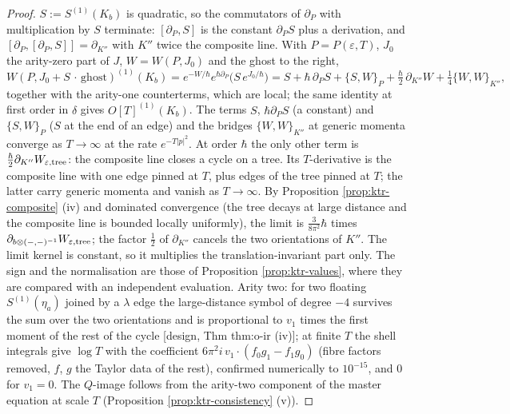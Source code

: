 \begin{proof}
$S:=S^{(1)}(K_b)$ is quadratic, so the commutators of $\partial_P$ with multiplication by $S$ terminate: $[\partial_P,S]$ is the constant $\partial_PS$ plus a derivation, and $[\partial_P,[\partial_P,S]]=\partial_{K''}$ with $K''$ twice the composite line. With $P=P(\varepsilon,T)$, $J_0$ the arity-zero part of $J$, $W=W(P,J_0)$ and the ghost to the right,
\[
W(P,J_0+S\,\cdot\,\text{ghost})^{(1)}(K_b)=e^{-W/\hbar}e^{\hbar\partial_P}\big(S\,e^{J_0/\hbar}\big)=S+\hbar\,\partial_PS+\{S,W\}_P+\tfrac\hbar2\,\partial_{K''}W+\tfrac14\{W,W\}_{K''},
\]
together with the arity-one counterterms, which are local; the same identity at first order in $\delta$ gives $O[T]^{(1)}(K_b)$. The terms $S$, $\hbar\partial_PS$ (a constant) and $\{S,W\}_P$ ($S$ at the end of an edge) and the bridges $\{W,W\}_{K''}$ at generic momenta converge as $T\to\infty$ at the rate $e^{-T|p|^2}$. At order $\hbar$ the only other term is $\tfrac\hbar2\partial_{K''}W_{\varepsilon,\rm tree}$: the composite line closes a cycle on a tree. Its $T$-derivative is the composite line with one edge pinned at $T$, plus edges of the tree pinned at $T$; the latter carry generic momenta and vanish as $T\to\infty$. By Proposition \ref{prop:ktr-composite} (iv) and dominated convergence (the tree decays at large distance and the composite line is bounded locally uniformly), the limit is $\tfrac{3}{8\pi^2}\hbar$ times $\partial_{b\otimes(-,-)^{-1}}W_{\varepsilon,\rm tree}$; the factor $\tfrac12$ of $\partial_{K''}$ cancels the two orientations of $K''$. The limit kernel is constant, so it multiplies the translation-invariant part only. The sign and the normalisation are those of Proposition \ref{prop:ktr-values}, where they are compared with an independent evaluation. Arity two: for two floating $S^{(1)}(\eta_a)$ joined by a $\lambda$ edge the large-distance symbol of degree $-4$ survives the sum over the two orientations and is proportional to $v_1$ times the first moment of the rest of the cycle [design, Thm thm:o-ir (iv)]; at finite $T$ the shell integrals give $\log T$ with the coefficient $6\pi^2i\,v_1\cdot(f_0g_1-f_1g_0)$ (fibre factors removed, $f$, $g$ the Taylor data of the rest), confirmed numerically to $10^{-15}$, and $0$ for $v_1=0$. The $Q$-image follows from the arity-two component of the master equation at scale $T$ (Proposition \ref{prop:ktr-consistency} (v)).
\end{proof}

